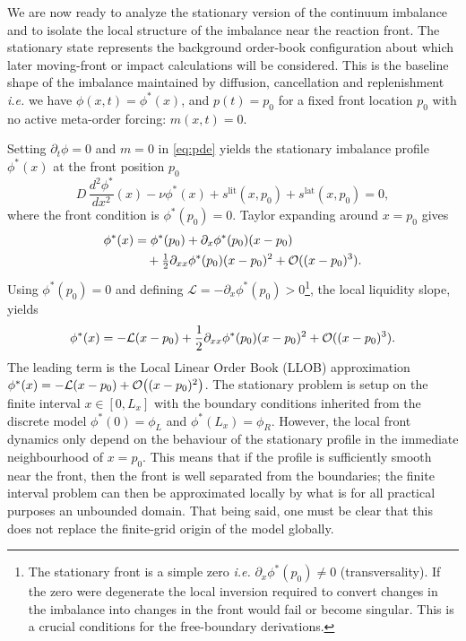 \documentclass[5p,final]{elsarticle}
\begin{document}
We are now ready to analyze the stationary version of the continuum imbalance and to isolate the local structure of the imbalance near the reaction front. The stationary state represents the background order-book configuration about which later moving-front or impact calculations will be considered. This is the baseline shape of the imbalance maintained by diffusion, cancellation and replenishment {\it i.e.} we have $\phi(x,t) = \phi^*(x)$, and $p(t) = p_0$ for a fixed front location $p_0$ with no active meta-order forcing: $m(x,t)=0$. 

Setting $\partial_t\phi=0$ and $m=0$ in \cref{eq:pde} yields the stationary imbalance profile $\phi^*(x)$ at the front position $p_0$
\begin{equation}
D\,\frac{d^2\phi^*}{dx^2}(x)-\nu\phi^*(x)+s^{\mathrm{lit}}(x,p_0)+s^{\mathrm{lat}}(x,p_0)=0, \label{eq:stationary}
\end{equation}
where the front condition is $\phi^*(p_0)=0$. Taylor expanding around $x=p_0$ gives
\begin{align}
\phi^*(x)&=\phi^*(p_0)+\partial_x\phi^*(p_0)(x-p_0)\nonumber\\
&\quad +\tfrac12\partial_{xx}\phi^*(p_0)(x-p_0)^2+{\cal O}((x-p_0)^3).
\end{align}
Using $\phi^*(p_0)=0$ and defining $\mathcal L=-\partial_x\phi^*(p_0)>0$\footnote{The stationary front is a simple zero {\it i.e.} $\partial_x \phi^*(p_0) \neq 0$ (transversality). If the zero were degenerate the local inversion required to convert changes in the imbalance into changes in the front would fail or become singular. This is a crucial conditions for the free-boundary derivations.}, the local liquidity slope, yields
\begin{equation}
\phi^*(x)=-\mathcal L(x-p_0)+\frac12\partial_{xx}\phi^*(p_0)(x-p_0)^2+{\cal O}((x-p_0)^3).
\end{equation}
The leading term is the Local Linear Order Book (LLOB) approximation $\phi^*(x)= -\mathcal L(x-p_0)+{\cal O}\bigl((x-p_0)^2\bigr)$. The stationary problem is setup on the finite interval $x \in [0,L_x]$ with the boundary conditions inherited from the discrete model $\phi^*(0)= \phi_L$ and $\phi^*(L_x)=\phi_R$. However, the local front dynamics only depend on the behaviour of the stationary profile in the immediate neighbourhood of $x=p_0$. This means that if the profile is sufficiently smooth near the front, then the front is well separated from the boundaries; the finite interval problem can then be approximated locally by what is for all practical purposes an unbounded domain. That being said, one must be clear that this does not replace the finite-grid origin of the model globally.
\end{document}
